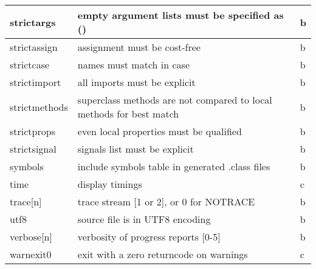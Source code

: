 \begin{longtable}[l]{|l|p{10cm}|l|}
\hline
 strictargs   & empty argument lists must be specified as () &b \\
\hline
 strictassign & assignment must be cost-free &b \\
\hline
 strictcase   & names must match in case &b \\
\hline
 strictimport & all imports must be explicit &b \\
\hline
 strictmethods & superclass methods are not compared to local methods for best match &b \\
\hline
 strictprops  & even local properties must be qualified &b \\
\hline
 strictsignal & signals list must be explicit &b \\
\hline
 symbols      & include symbols table in generated .class files &b \\
\hline
 time         & display timings &c \\
\hline
 trace[n]     & trace stream [1 or 2], or 0 for NOTRACE &b \\
\hline
 utf8         & source file is in UTF8 encoding &b \\
\hline
 verbose[n]   & verbosity of progress reports [0-5] &b \\
\hline
 warnexit0    & exit with a zero returncode on warnings &c \\
\hline
\end{longtable}

